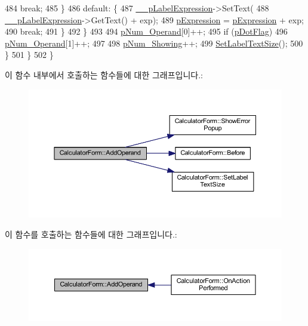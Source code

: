 \begin{DoxyCode}
484                 \textcolor{keywordflow}{break};
485             \}
486             \textcolor{keywordflow}{default}: \{
487                 \hyperlink{class_calculator_form_a85c791f34a8b69e7d22b7d64d7f69bac}{\_\_pLabelExpression}->SetText(
488                         \hyperlink{class_calculator_form_a85c791f34a8b69e7d22b7d64d7f69bac}{\_\_pLabelExpression}->GetText() + exp);
489                 \hyperlink{_calculator_form_8cpp_a8e641e0c730e6831fcb8e9caf57f5285}{pExpression} = \hyperlink{_calculator_form_8cpp_a8e641e0c730e6831fcb8e9caf57f5285}{pExpression} + exp;
490                 \textcolor{keywordflow}{break};
491             \}
492             \}
493 
494             \hyperlink{_calculator_form_8cpp_a564e048fb0774fad296f0ce77b108d23}{pNum\_Operand}[0]++;
495             \textcolor{keywordflow}{if} (\hyperlink{_calculator_form_8cpp_af728e21ac3463ebc5e7746a542efb32f}{pDotFlag})
496                 \hyperlink{_calculator_form_8cpp_a564e048fb0774fad296f0ce77b108d23}{pNum\_Operand}[1]++;
497 
498             \hyperlink{_calculator_form_8cpp_afab1dc0f42edf6d2d70e1a3b9a23114b}{pNum\_Showing}++;
499             \hyperlink{class_calculator_form_ac55d87afff38e894b348eeb01a058c70}{SetLabelTextSize}();
500         \}
501     \}
502 \}
\end{DoxyCode}


이 함수 내부에서 호출하는 함수들에 대한 그래프입니다.\+:
\nopagebreak
\begin{figure}[H]
\begin{center}
\leavevmode
\includegraphics[width=350pt]{class_calculator_form_ad23e66a668778e9354b831dbac18a689_cgraph}
\end{center}
\end{figure}




이 함수를 호출하는 함수들에 대한 그래프입니다.\+:
\nopagebreak
\begin{figure}[H]
\begin{center}
\leavevmode
\includegraphics[width=350pt]{class_calculator_form_ad23e66a668778e9354b831dbac18a689_icgraph}
\end{center}
\end{figure}


